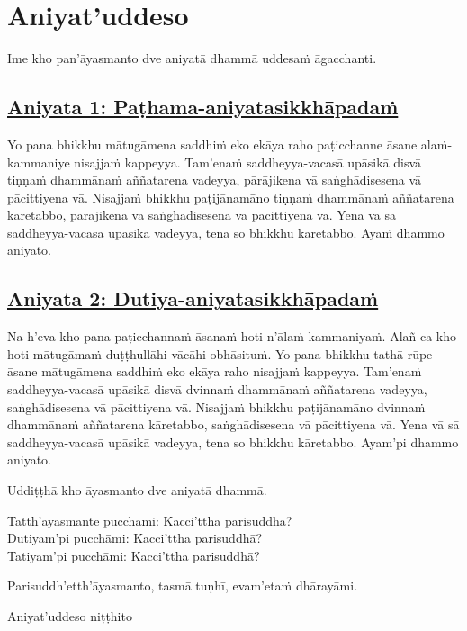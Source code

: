 \section{Aniyat'uddeso}
\label{aniy}

\begin{intro}
  Ime kho pan'āyasmanto dve aniyatā dhammā uddesaṁ āgacchanti.
\end{intro}

\subsection*{\hyperref[unc1]{Aniyata 1: Paṭhama-aniyatasikkhāpadaṁ}}
\label{aniy1}

Yo pana bhikkhu mātugāmena saddhiṁ eko ekāya raho paṭicchanne āsane alaṁ-kammaniye nisajjaṁ kappeyya. Tam'enaṁ saddheyya-vacasā upāsikā disvā tiṇṇaṁ dhammānaṁ aññatarena vadeyya, pārājikena vā saṅghādisesena vā pācittiyena vā. Nisajjaṁ bhikkhu paṭijānamāno tiṇṇaṁ dhammānaṁ aññatarena kāretabbo, pārājikena vā saṅghādisesena vā pācittiyena vā. Yena vā sā saddheyya-vacasā upāsikā vadeyya, tena so bhikkhu kāretabbo. Ayaṁ dhammo aniyato.

\subsection*{\hyperref[unc2]{Aniyata 2: Dutiya-aniyatasikkhāpadaṁ}}
\label{aniy2}

Na h'eva kho pana paṭicchannaṁ āsanaṁ hoti n'ālaṁ-kammaniyaṁ. Alañ-ca kho hoti mātugāmaṁ duṭṭhullāhi vācāhi obhāsituṁ. Yo pana bhikkhu tathā-rūpe āsane mātugāmena saddhiṁ eko ekāya raho nisajjaṁ kappeyya. Tam'enaṁ saddheyya-vacasā upāsikā disvā dvinnaṁ dhammānaṁ aññatarena vadeyya, saṅghādisesena vā pācittiyena vā. Nisajjaṁ bhikkhu paṭijānamāno dvinnaṁ dhammānaṁ aññatarena kāretabbo, saṅghādisesena vā pācittiyena vā. Yena vā sā saddheyya-vacasā upāsikā vadeyya, tena so bhikkhu kāretabbo. Ayam'pi dhammo aniyato.

\medskip

\begin{center}
Uddiṭṭhā kho āyasmanto dve aniyatā dhammā.

\smallskip

Tatth'āyasmante pucchāmi: Kacci'ttha parisuddhā?\\
Dutiyam'pi pucchāmi: Kacci'ttha parisuddhā?\\
Tatiyam'pi pucchāmi: Kacci'ttha parisuddhā?

\smallskip

Parisuddh'etth'āyasmanto, tasmā tuṇhī, evam'etaṁ dhārayāmi.
\end{center}

\begin{outro}
Aniyat'uddeso niṭṭhito
\end{outro}

\clearpage
